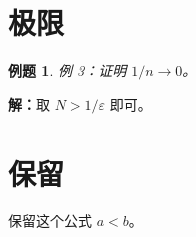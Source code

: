 \documentclass{ctexart}
\newtheorem{example}{例题}
\begin{document}
\section{极限}
\begin{example}例 3：证明 $1/n\to0$。\end{example}
\textbf{解：}取 $N>1/\varepsilon$ 即可。
\section{保留}
保留这个公式 $a<b$。
\end{document}

